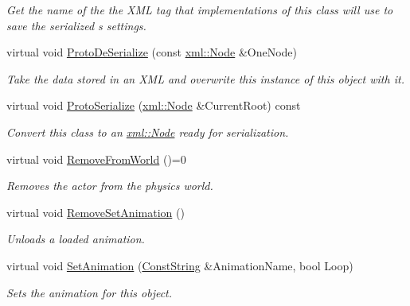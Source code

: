 \begin{DoxyCompactItemize}
\begin{DoxyCompactList}\small\item\em Get the name of the the XML tag that implementations of this class will use to save the serialized s settings. \item\end{DoxyCompactList}\item 
virtual void \hyperlink{classMezzanine_1_1ActorBase_a32c1aee35ce5b3ad6c64d3cfa34c4a2d}{ProtoDeSerialize} (const \hyperlink{classMezzanine_1_1xml_1_1Node}{xml::Node} \&OneNode)
\begin{DoxyCompactList}\small\item\em Take the data stored in an XML and overwrite this instance of this object with it. \item\end{DoxyCompactList}\item 
virtual void \hyperlink{classMezzanine_1_1ActorBase_ad3cb5ddfcd7abe2b39e690a8b6a79d47}{ProtoSerialize} (\hyperlink{classMezzanine_1_1xml_1_1Node}{xml::Node} \&CurrentRoot) const 
\begin{DoxyCompactList}\small\item\em Convert this class to an \hyperlink{classMezzanine_1_1xml_1_1Node}{xml::Node} ready for serialization. \item\end{DoxyCompactList}\item 
\hypertarget{classMezzanine_1_1ActorBase_a30910dd0351bc29b2bf88cb3dc8d83db}{
virtual void \hyperlink{classMezzanine_1_1ActorBase_a30910dd0351bc29b2bf88cb3dc8d83db}{RemoveFromWorld} ()=0}
\label{classMezzanine_1_1ActorBase_a30910dd0351bc29b2bf88cb3dc8d83db}

\begin{DoxyCompactList}\small\item\em Removes the actor from the physics world. \item\end{DoxyCompactList}\item 
virtual void \hyperlink{classMezzanine_1_1ActorBase_a148df02e486650cba1aa384faf85975f}{RemoveSetAnimation} ()
\begin{DoxyCompactList}\small\item\em Unloads a loaded animation. \item\end{DoxyCompactList}\item 
virtual void \hyperlink{classMezzanine_1_1ActorBase_af81c2b16a0a73608d9af4f9fb7e82ef4}{SetAnimation} (\hyperlink{namespaceMezzanine_a63cd699ac54b73953f35ec9cfc05e506}{ConstString} \&AnimationName, bool Loop)
\begin{DoxyCompactList}\small\item\em Sets the animation for this object. \item\end{DoxyCompactList}\end{DoxyCompactItemize}
